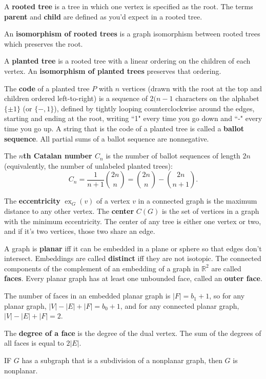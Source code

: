 \documentclass[10pt]{article}
\begin{document}
A \textbf{rooted tree} is a tree in which one vertex is specified as the root. The terms \textbf{parent} and \textbf{child} are defined as you'd expect in a rooted tree.
\par
An \textbf{isomorphism of rooted trees} is a graph isomorphism between rooted trees which preserves the root.
\par
A \textbf{planted tree} is a rooted tree with a linear ordering on the children of each vertex. An \textbf{isomorphism of planted trees} preserves that ordering.
\par
The \textbf{code} of a planted tree $P$ with $n$ vertices (drawn with the root at the top and children ordered left-to-right) is a sequence of $2(n-1$ characters on the alphabet $\{\pm 1\}$ (or $\{-,1\}$), defined by tightly looping counterclockwise around the edges, starting and ending at the root, writing ``1" every time you go down and ``-" every time you go up. A string that is the code of a planted tree is called a \textbf{ballot sequence}. All partial sums of a ballot sequence are nonnegative.
\par
The \textbf{$n$th Catalan number $C_n$} is the number of ballot sequences of length $2n$ (equivalently, the number of unlabeled planted trees):
\[ C_n = \frac{1}{n+1} \binom{2n}{n}=\binom{2n}{n}-\binom{2n}{n+1}. \]
\par
The \textbf{eccentricity} $ \operatorname{ex}_G(v)$ of a vertex $v$ in a connected graph is the maximum distance to any other vertex. The \textbf{center} $C(G)$ is the set of vertices in a graph with the minimum eccentricity. The center of any tree is either one vertex or two, and if it's two vertices, those two share an edge.
\par
A graph is \textbf{planar} iff it can be embedded in a plane or sphere so that edges don't intersect. Embeddings are called \textbf{distinct} iff they are not isotopic. The connected components of the complement of an embedding of a graph in $\mathbb{R}^2$ are called \textbf{faces}. Every planar graph has at least one unbounded face, called an \textbf{outer face}.
\par
The number of faces in an embedded planar graph is $|F|=b_1+1$, so for any planar graph, $|V|-|E|+|F|=b_0+1$, and for any connected planar graph, $|V|-|E|+|F|=2$.
\par
The \textbf{degree of a face} is the degree of the dual vertex. The sum of the degrees of all faces is equal to $2 |E|$.
\par
IF $G$ has a subgraph that is a subdivision of a nonplanar graph, then $G$ is nonplanar.
\end{document}
